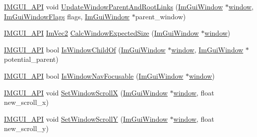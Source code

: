 \begin{DoxyCompactItemize}
\mbox{\hyperlink{imgui_8h_a43829975e84e45d1149597467a14bbf5}{I\+M\+G\+U\+I\+\_\+\+A\+PI}} void \mbox{\hyperlink{namespace_im_gui_a85d7262320ed7ce8e40863b99f8db4a3}{Update\+Window\+Parent\+And\+Root\+Links}} (\mbox{\hyperlink{struct_im_gui_window}{Im\+Gui\+Window}} $\ast$\mbox{\hyperlink{radar_8cpp_a80de27bd7dc4e2b2ad3d5895b97a70f0}{window}}, \mbox{\hyperlink{imgui_8h_a0b8e067ab4f7a818828c8d89e531addc}{Im\+Gui\+Window\+Flags}} flags, \mbox{\hyperlink{struct_im_gui_window}{Im\+Gui\+Window}} $\ast$parent\+\_\+window)
\item 
\mbox{\hyperlink{imgui_8h_a43829975e84e45d1149597467a14bbf5}{I\+M\+G\+U\+I\+\_\+\+A\+PI}} \mbox{\hyperlink{struct_im_vec2}{Im\+Vec2}} \mbox{\hyperlink{namespace_im_gui_ae81c20afd5ce4b663f48d05c40af93f9}{Calc\+Window\+Expected\+Size}} (\mbox{\hyperlink{struct_im_gui_window}{Im\+Gui\+Window}} $\ast$\mbox{\hyperlink{radar_8cpp_a80de27bd7dc4e2b2ad3d5895b97a70f0}{window}})
\item 
\mbox{\hyperlink{imgui_8h_a43829975e84e45d1149597467a14bbf5}{I\+M\+G\+U\+I\+\_\+\+A\+PI}} bool \mbox{\hyperlink{namespace_im_gui_a2ca7721bfc85f5e98c212c2e9ad793b5}{Is\+Window\+Child\+Of}} (\mbox{\hyperlink{struct_im_gui_window}{Im\+Gui\+Window}} $\ast$\mbox{\hyperlink{radar_8cpp_a80de27bd7dc4e2b2ad3d5895b97a70f0}{window}}, \mbox{\hyperlink{struct_im_gui_window}{Im\+Gui\+Window}} $\ast$potential\+\_\+parent)
\item 
\mbox{\hyperlink{imgui_8h_a43829975e84e45d1149597467a14bbf5}{I\+M\+G\+U\+I\+\_\+\+A\+PI}} bool \mbox{\hyperlink{namespace_im_gui_a6dfaa7187edcbc862be2edb2bbc987bb}{Is\+Window\+Nav\+Focusable}} (\mbox{\hyperlink{struct_im_gui_window}{Im\+Gui\+Window}} $\ast$\mbox{\hyperlink{radar_8cpp_a80de27bd7dc4e2b2ad3d5895b97a70f0}{window}})
\item 
\mbox{\hyperlink{imgui_8h_a43829975e84e45d1149597467a14bbf5}{I\+M\+G\+U\+I\+\_\+\+A\+PI}} void \mbox{\hyperlink{namespace_im_gui_acf275b9e13b29083f8ec22adb3e76306}{Set\+Window\+ScrollX}} (\mbox{\hyperlink{struct_im_gui_window}{Im\+Gui\+Window}} $\ast$\mbox{\hyperlink{radar_8cpp_a80de27bd7dc4e2b2ad3d5895b97a70f0}{window}}, float new\+\_\+scroll\+\_\+x)
\item 
\mbox{\hyperlink{imgui_8h_a43829975e84e45d1149597467a14bbf5}{I\+M\+G\+U\+I\+\_\+\+A\+PI}} void \mbox{\hyperlink{namespace_im_gui_aa6ccd0096d175543a43078b3f6ecb333}{Set\+Window\+ScrollY}} (\mbox{\hyperlink{struct_im_gui_window}{Im\+Gui\+Window}} $\ast$\mbox{\hyperlink{radar_8cpp_a80de27bd7dc4e2b2ad3d5895b97a70f0}{window}}, float new\+\_\+scroll\+\_\+y)
\item 

\end{DoxyCompactItemize}

